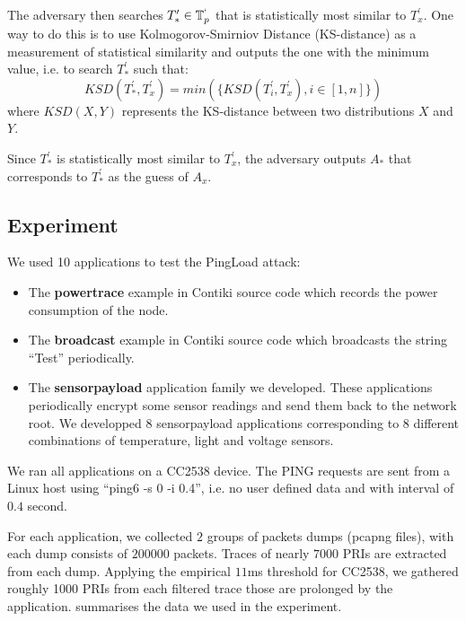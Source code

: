\begin{description}
	The adversary then searches $T^{\prime}_* \in \mathbb{T}^{`}_p$ that is statistically most similar to $T^{\prime}_x$. One way to do this is to use Kolmogorov-Smirniov Distance (KS-distance) as a measurement of statistical similarity and outputs the one with the minimum value, i.e. to search $T^{\prime}_*$ such that:
	\begin{equation}
		KSD( T^{\prime}_*, T^{\prime}_x) = min(\{KSD(T^{\prime}_i, T^{\prime}_x), i \in [1,n]\})
	\end{equation}
	where $KSD(X, Y)$ represents the KS-distance between two distributions $X$ and $Y$.
	
	Since $T^{\prime}_*$ is statistically most similar to $T^{\prime}_x$, the adversary outputs $A_*$ that corresponds to $T^{\prime}_*$ as the guess of $A_x$.
\end{description}

\subsection{Experiment}

We used 10 applications to test the PingLoad attack:
\begin{itemize}
	\item The \textbf{powertrace} example in Contiki source code which records the power consumption of the node.
	\item The \textbf{broadcast} example in Contiki source code which broadcasts the string ``Test'' periodically.
	\item The \textbf{sensorpayload} application family we developed. These applications periodically encrypt some sensor readings and send them back to the network root. We developped $8$ sensorpayload applications corresponding to $8$ different combinations of temperature, light and voltage sensors.
\end{itemize}

We  ran all applications on a CC2538 device. The PING requests are sent from a Linux host using ``ping6 -s 0 -i 0.4'', i.e. no user defined data and with interval of $0.4$ second. 

For each application, we collected $2$ groups of packets dumps (pcapng files), with each dump consists of $200000$ packets. Traces of nearly $7000$ PRIs are extracted from each dump. Applying the empirical $11$ms threshold for CC2538, we gathered roughly 1000 PRIs from each filtered trace those are prolonged by the application.  summarises the data we used in the experiment.

